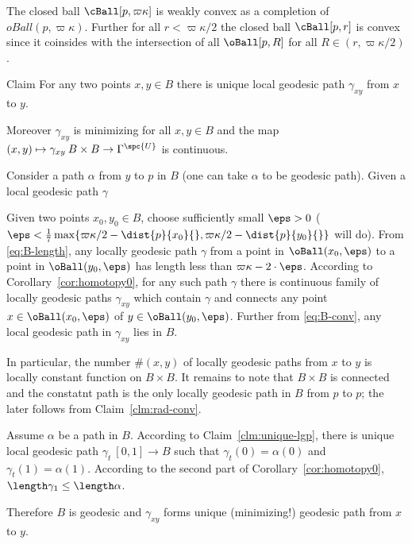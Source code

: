 The closed ball $\cBall[p,\varpi\kappa]$ is weakly convex as a completion of $oBall(p,\varpi\kappa)$.
Further for all $r<\varpi\kappa/2$ the closed ball
$\cBall[p,r]$ is convex since it coinsides with the intersection of all 
$\oBall[p,R]$ for all $R\in(r,\varpi\kappa/2)$.








\begin{clm}{Claim}\label{clm:unique-lgp}
For any two points $x,y\in B$ there is unique local geodesic path $\gamma_{xy}$ from $x$ to $y$.

Moreover $\gamma_{xy}$ is minimizing for all $x,y\in B$ 
and the map 
$(x,y)\mapsto \gamma_{xy}\:B\times B\to\Gamma^\spc{U}$ is continuous.
\end{clm}

Consider a path $\alpha$ from $y$ to $p$ in $B$
(one can take $\alpha$ to be geodesic path).
Given a local geodesic path $\gamma$  


Given two points $x_0,y_0\in B$,  choose sufficiently small $\eps>0$
($\eps<\tfrac1{7}\max\{\varpi\kappa/2-\dist{p}{x_0}{},\varpi\kappa/2-\dist{p}{y_0}{}\}$ will do).
From \ref{eq:B-length}, any locally geodesic path $\gamma$
from a point in $\oBall(x_0,\eps)$ to a point in $\oBall(y_0,\eps)$ has length less than $\varpi\kappa-2\cdot\eps$.
According to Corollary~\ref{cor:homotopy0}, 
for any such path $\gamma$ 
there is continuous family of locally geodesic paths $\gamma_{xy}$ 
which contain $\gamma$ and connects any point $x\in\oBall(x_0,\eps)$ of $y\in\oBall(y_0,\eps)$.
Further from \ref{eq:B-conv}, any local geodesic path in $\gamma_{xy}$ lies in $B$.

In particular, the number $\#(x,y)$ 
of locally geodesic paths from $x$ to $y$ is locally constant function on $B\times B$.
It remains to note that $B\times B$ is connected 
and the constatnt path is the only locally geodesic path in $B$ from $p$ to $p$;
the later follows from Claim~\ref{clm:rad-conv}.
\qeds

Assume $\alpha$ be a path in $B$.
According to Claim~\ref{clm:unique-lgp},
there is unique 
local geodesic path $\gamma_t\:[0,1]\to B$ such that $\gamma_t(0)=\alpha(0)$ and $\gamma_t(1)=\alpha(1)$.
According to the second part of Corollary~\ref{cor:homotopy0}, $\length\gamma_1\le\length\alpha$.

Therefore $B$ is geodesic and  $\gamma_{xy}$ forms 
unique (minimizing!) geodesic path from $x$ to $y$.













